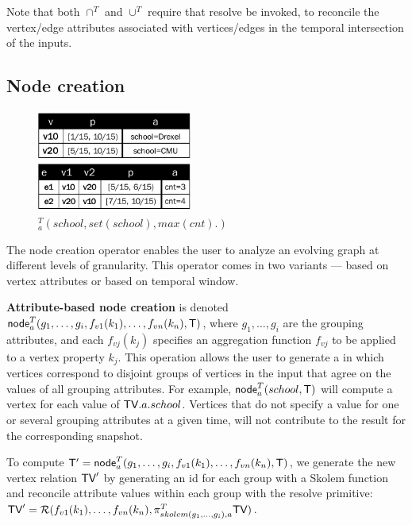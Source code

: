 Note that both $\cap^T$ and $\cup^T$ require that resolve be invoked,
to reconcile the vertex/edge attributes associated with vertices/edges
in the temporal intersection of the inputs.


\subsection{Node creation}
\label{sec:algebra:ncreate}

\begin{figure}[b]
\includegraphics[width=2in]{figs/agg3.pdf}
\vspace{-0.2cm}
\caption{$^T_a(school, set(school), max(cnt).)$}
\vspace{-0.4cm}
\label{fig:tg_agg3}
\end{figure}

The node creation operator enables the user to analyze an evolving
graph at different levels of granularity.  This operator comes in two
variants --- based on vertex attributes or based on temporal window.

{\bf Attribute-based node creation} is
denoted\\ $\textsf{node}^T_a(g_1,\ldots,g_i,f_{v1}(k_1),\ldots,f_{vn}(k_n),\mathsf{T})$,
where $g_1,\ldots,g_i$ are the grouping attributes, and each
$f_{vj}(k_j)$ specifies an aggregation function $f_{vj}$ to be applied
to a vertex property $k_j$.  This operation allows the user to
generate a \tg in which vertices correspond to disjoint groups of
vertices in the input that agree on the values of all grouping
attributes.  For example, $\textsf{node}^T_a(school,\mathsf{T})$ will compute
a vertex for each value of $\textsf{TV}.a.school$.  Vertices that do not
specify a value for one or several grouping attributes at a given
time, will not contribute to the result for the corresponding
snapshot.

To compute $\mathsf{T}' =
\textsf{node}^T_a(g_1,\ldots,g_i,f_{v1}(k_1),\ldots,f_{vn}(k_n),\mathsf{T})$,
we generate the new vertex relation $\textsf{TV}'$ by generating an id for
each group with a Skolem function and reconcile attribute values
within each group with the resolve primitive: $\textsf{TV}' =
\mathcal{R}(f_{v1}(k_1),\ldots,f_{vn}(k_n),\pi^T_{skolem(g_1,\ldots,g_i), a} \textsf{TV})$.

